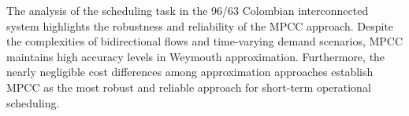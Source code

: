 The analysis of the scheduling task in the 96/63 Colombian interconnected system highlights the robustness and reliability of the MPCC approach. Despite the complexities of bidirectional flows and time-varying demand scenarios, MPCC maintains high accuracy levels in Weymouth approximation. Furthermore, the nearly negligible cost differences among approximation approaches establish MPCC as the most robust and reliable approach for short-term operational scheduling.

%
